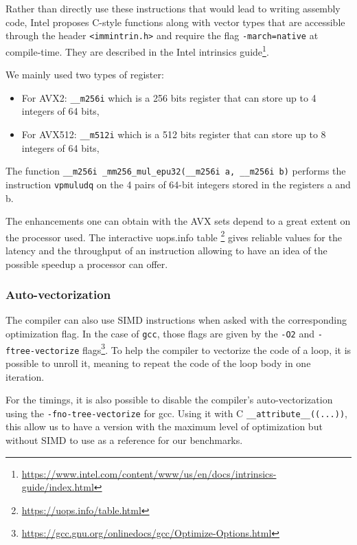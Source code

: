 \documentclass[a4paper]{article}
\begin{document}
\bigskip
Rather than directly use these instructions that would lead to writing assembly code, Intel proposes C-style functions
along with vector types that are accessible through the header \texttt{<immintrin.h>} and require the flag \texttt{-march=native} at 
compile-time.
They are described in the Intel intrinsics guide\footnote{\url{https://www.intel.com/content/www/us/en/docs/intrinsics-guide/index.html}}.

\bigskip
We mainly used two types of register: 
\begin{itemize}
    \item For AVX2: \texttt{\_\_m256i} which is a 256 bits register that can store up to 4 integers of 64 bits,
    \item For AVX512: \texttt{\_\_m512i} which is a 512 bits register that can store up to 8 integers of 64 bits,
\end{itemize}


\begin{example}
    The function \texttt{\_\_m256i \_mm256\_mul\_epu32(\_\_m256i a, \_\_m256i b)} performs the instruction \texttt{vpmuludq}
    on the 4 pairs of 64-bit integers stored in the registers a and b.
\end{example}

\bigskip
The enhancements one can obtain with the AVX sets depend to a great extent on the processor used.
The interactive uops.info table \footnote{\url{https://uops.info/table.html}} gives reliable values
for the latency and the throughput of an instruction allowing to have an idea of the possible speedup 
a processor can offer.

\subsubsection{Auto-vectorization}

The compiler can also use SIMD instructions when asked with the corresponding
optimization flag. In the case of \texttt{gcc}, those flags are given by the
\texttt{-O2} and \texttt{-ftree-vectorize}
flags\footnote{\url{https://gcc.gnu.org/onlinedocs/gcc/Optimize-Options.html}}.
To help the compiler to vectorize the code of a loop, it is possible to
unroll it, meaning to repeat the code of the loop body in one iteration.

For the timings, it is also possible to disable the compiler's
auto-vectorization using the \texttt{-fno-tree-vectorize} for gcc. Using it with
C \texttt{\_\_attribute\_\_((...))}, this allow us to have a version with the
maximum level of optimization but without SIMD to use as a reference for our
benchmarks.
\end{document}
